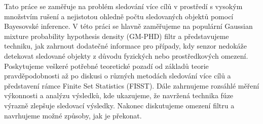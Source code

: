 Tato práce se zaměřuje na problém sledování více cílů v prostředí s vysokým množstvím rušení a nejistotou ohledně počtu sledovaných objektů pomocí Bayesovské inference. V této práci se hlavně zaměřujeme na populární Gaussian mixture probability hypothesis density (GM-PHD) filtr a představujeme techniku, jak zahrnout dodatečné informace pro případy, kdy senzor nedokáže detekovat sledované objekty z důvodu fyzických nebo prostředkových omezení. Poskytujeme veškeré potřebné teoretické pozadí od základů teorie pravděpodobnosti až po diskusi o různých metodách sledování více cílů a představení rámce Finite Set Statistics (FISST). Dále zahrnujeme rozsáhlé měření výkonnosti a analýzu výsledků, kde ukazujeme, že navržená technika fúze výrazně zlepšuje sledovací výsledky. Nakonec diskutujeme omezení filtru a navrhujeme možné způsoby, jak je překonat.
